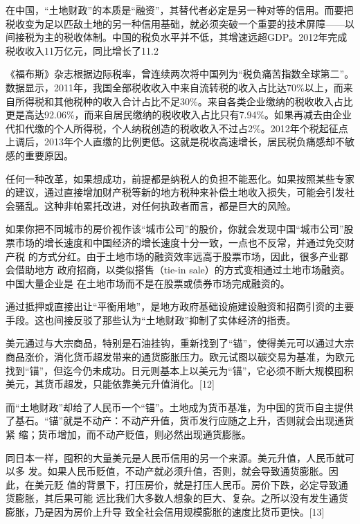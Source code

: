 在中国，“土地财政”的本质是“融资”，其替代者必定是另一种对等的信用。而要把税收变为足以匹敌土地的另一种信用基础，就必须突破一个重要的技术屏障——以间接税为主的税收体制。中国的税负水平并不低，其增速远超GDP。2012年完成税收收入11万亿元，同比增长了11.2%

《福布斯》杂志根据边际税率，曾连续两次将中国列为“税负痛苦指数全球第二”。
数据显示，2011年，我国全部税收收入中来自流转税的收入占比达70\%以上，而来自所得税和其他税种的收入合计占比不足30\%。来自各类企业缴纳的税收收入占比更是高达92.06\%，而来自居民缴纳的税收收入占比只有7.94\%。如果再减去由企业代扣代缴的个人所得税，个人纳税创造的税收收入不过占2\%。2012年个税起征点上调后，2013年个人直缴的比例更低。这就是税收高速增长，居民税负痛感却不敏感的重要原因。

任何一种改革，如果想成功，前提都是纳税人的负担不能恶化。如果按照某些专家的建议，通过直接增加财产税等新的地方税种来补偿土地收入损失，可能会引发社会骚乱。这种非帕累托改进，对任何执政者而言，都是巨大的风险。

如果你把不同城市的房价视作该“城市公司”的股价，你就会发现中国“城市公司”股
票市场的增长速度和中国经济的增长速度十分一致，一点也不反常，并通过免交财产税
的方式分红。由于土地市场的融资效率远高于股票市场，因此，很多产业都会借助地方
政府招商，以类似搭售（tie-in sale）的方式变相通过土地市场融资。中国大量企业是
在土地市场而不是在股票或债券市场完成融资的。

通过抵押或直接出让“平衡用地”，是地方政府基础设施建设融资和招商引资的主要手段。这也间接反驳了那些认为“土地财政”抑制了实体经济的指责。

美元通过与大宗商品，特别是石油挂钩，重新找到了“锚”，使得美元可以通过大宗商品涨价，消化货币超发带来的通货膨胀压力。欧元试图以碳交易为基准，为欧元找到“锚”，但迄今仍未成功。日元则基本上以美元为“锚”，它必须不断大规模囤积美元，其货币超发，只能依靠美元升值消化。[12]

而“土地财政”却给了人民币一个“锚”。土地成为货币基准，为中国的货币自主提供
了基石。“锚”就是不动产：不动产升值，货币发行应随之上升，否则就会出现通货紧
缩；货币增加，而不动产贬值，则必然出现通货膨胀。

同日本一样，囤积的大量美元是人民币信用的另一个来源。美元升值，人民币就可以多
发。如果人民币贬值，不动产就必须升值，否则，就会导致通货膨胀。因此，在美元贬
值的背景下，打压房价，就是打压人民币。房价下跌，必定导致通货膨胀，其后果可能
远比我们大多数人想象的巨大、复杂。之所以没有发生通货膨胀，乃是因为房价上升导
致全社会信用规模膨胀的速度比货币更快。[13]

